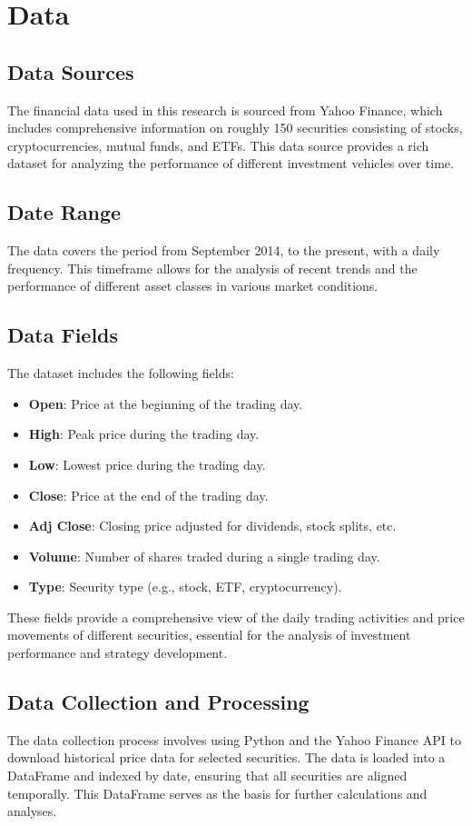 \section{Data}
\subsection{Data Sources}
The financial data used in this research is sourced from Yahoo Finance, which includes comprehensive information on roughly 150 securities consisting of stocks, cryptocurrencies, mutual funds, and ETFs. This data source provides a rich dataset for analyzing the performance of different investment vehicles over time.

\subsection{Date Range}
The data covers the period from September 2014, to the present, with a daily frequency. This timeframe allows for the analysis of recent trends and the performance of different asset classes in various market conditions.

\subsection{Data Fields}
The dataset includes the following fields:
\begin{itemize}
    \item \textbf{Open}: Price at the beginning of the trading day.
    \item \textbf{High}: Peak price during the trading day.
    \item \textbf{Low}: Lowest price during the trading day.
    \item \textbf{Close}: Price at the end of the trading day.
    \item \textbf{Adj Close}: Closing price adjusted for dividends, stock splits, etc.
    \item \textbf{Volume}: Number of shares traded during a single trading day.
    \item \textbf{Type}: Security type (e.g., stock, ETF, cryptocurrency).
\end{itemize}

These fields provide a comprehensive view of the daily trading activities and price movements of different securities, essential for the analysis of investment performance and strategy development.

\subsection{Data Collection and Processing}
The data collection process involves using Python and the Yahoo Finance API to download historical price data for selected securities. The data is loaded into a DataFrame and indexed by date, ensuring that all securities are aligned temporally. This DataFrame serves as the basis for further calculations and analyses.

